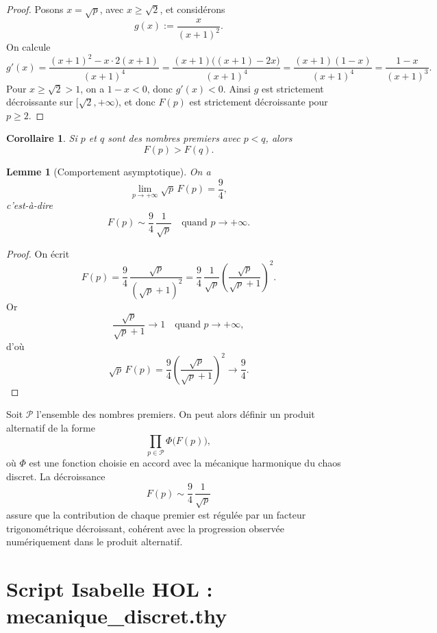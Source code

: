 \documentclass[12pt,a4paper]{article}
\newtheorem{lemma}{Lemme}
\newtheorem{corollary}{Corollaire}
\theoremstyle{definition}
\theoremstyle{remark}
\begin{document}
\begin{proof}
Posons $x = \sqrt{p}$, avec $x \ge \sqrt{2}$, et considérons
\[
g(x) := \frac{x}{(x+1)^{2}}.
\]
On calcule
\[
g'(x)
= \frac{(x+1)^{2} - x \cdot 2(x+1)}{(x+1)^{4}}
= \frac{(x+1)\bigl((x+1) - 2x\bigr)}{(x+1)^{4}}
= \frac{(x+1)(1 - x)}{(x+1)^{4}}
= \frac{1 - x}{(x+1)^{3}}.
\]
Pour $x \ge \sqrt{2} > 1$, on a $1 - x < 0$, donc $g'(x) < 0$. Ainsi $g$ est strictement décroissante sur $[\sqrt{2},+\infty)$, et donc $F(p)$ est strictement décroissante pour $p \ge 2$.
\end{proof}

\begin{corollary}
Si $p$ et $q$ sont des nombres premiers avec $p < q$, alors
\[
F(p) > F(q).
\]
\end{corollary}

\begin{lemma}[Comportement asymptotique]
On a
\[
\lim_{p \to +\infty} \sqrt{p}\,F(p) = \frac{9}{4},
\]
c’est-à-dire
\[
F(p) \sim \frac{9}{4}\,\frac{1}{\sqrt{p}}
\quad \text{quand } p \to +\infty.
\]
\end{lemma}

\begin{proof}
On écrit
\[
F(p)
= \frac{9}{4}\,\frac{\sqrt{p}}{(\sqrt{p}+1)^{2}}
= \frac{9}{4}\,\frac{1}{\sqrt{p}}\left(\frac{\sqrt{p}}{\sqrt{p}+1}\right)^{2}.
\]
Or
\[
\frac{\sqrt{p}}{\sqrt{p}+1} \longrightarrow 1
\quad \text{quand } p \to +\infty,
\]
d’où
\[
\sqrt{p}\,F(p)
= \frac{9}{4}\left(\frac{\sqrt{p}}{\sqrt{p}+1}\right)^{2}
\longrightarrow \frac{9}{4}.
\]
\end{proof}

Soit $\mathcal{P}$ l’ensemble des nombres premiers. On peut alors définir un produit alternatif de la forme
\[
\prod_{p \in \mathcal{P}} \Phi\bigl(F(p)\bigr),
\]
où $\Phi$ est une fonction choisie en accord avec la mécanique harmonique du chaos discret.
La décroissance
\[
F(p) \sim \frac{9}{4}\,\frac{1}{\sqrt{p}}
\]
assure que la contribution de chaque premier est régulée par un facteur trigonométrique
décroissant, cohérent avec la progression observée numériquement dans le produit alternatif.



\section{Script Isabelle HOL : mecanique\_discret.thy}
\end{document}
